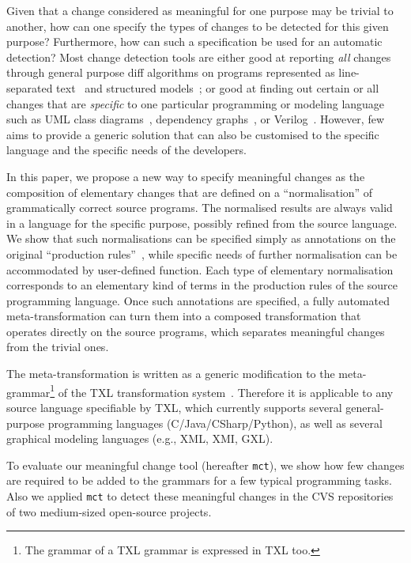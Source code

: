 \documentclass[10pt, conference, compsocconf]{IEEEtran}
\begin{document}
Given that a change considered as meaningful for one purpose may be trivial to another, how can one specify the types of changes to be detected for this given purpose? Furthermore, how can such a specification be used for an automatic detection? Most change detection tools are either good at reporting {\em all} changes through general purpose diff algorithms on programs represented as line-separated text~\cite{diff, canfora09software} and structured models~\cite{DBLP:conf/sle/HeidenreichJSW09}; or good at finding out certain or all changes that are {\em specific} to one particular programming or modeling language such as UML class diagrams~\cite{xing05ase}, dependency graphs~\cite{Jackson:1994:SDT:645543.655704}, or Verilog~\cite{Duley:2010:PDA:1858996.1859093}. However, few aims to provide a generic solution that can also be customised to the specific language and the specific needs of the developers.

In this paper, we propose a new way to specify meaningful changes as the composition of elementary changes that are defined on a ``normalisation'' of grammatically correct source programs. The normalised results are always valid in a language for the specific purpose, possibly refined from the source language. We show that such normalisations can be specified simply as annotations on the original ``production rules''~\cite{Aho:1986:CPT:6448}, while specific needs of further normalisation can be accommodated by user-defined function. Each type of elementary normalisation corresponds to an elementary kind of terms in the production rules of the source programming language. Once such annotations are specified, a fully automated meta-transformation can turn them into a composed transformation that operates directly on the source programs, which separates meaningful changes from the trivial ones. 

The meta-transformation is written as a generic modification to the meta-grammar\footnote{The grammar of a TXL grammar is expressed in TXL too.} of the TXL transformation system~\cite{txl}. Therefore it is applicable to any source language specifiable by TXL, which currently supports several general-purpose programming languages (C/Java/CSharp/Python), as well as several graphical modeling languages (e.g., XML, XMI, GXL). 

To evaluate our meaningful change tool  (hereafter {\tt mct}), we show how few changes are required to be added to the grammars for a few typical programming tasks. Also we applied {\tt mct} to detect these meaningful changes in the CVS repositories of two medium-sized open-source projects.  
   
\end{document}
